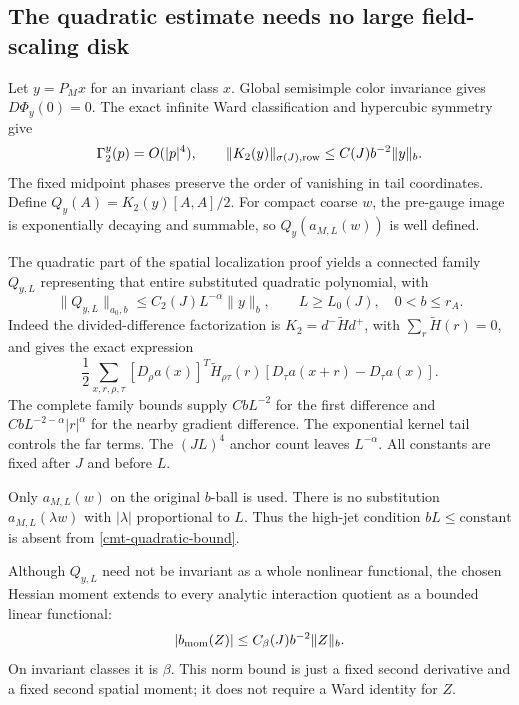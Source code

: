 \subsection{The quadratic estimate needs no large field-scaling disk}
\label{cmt-quadratic-section}

Let \(y=P_Mx\) for an invariant class \(x\). Global semisimple
color invariance gives \(D\Phi_y(0)=0\). The exact infinite Ward
classification and hypercubic symmetry give
\begin{equation}
 \Gamma_2^y(p)=O(|p|^4),\qquad
 \|K_2(y)\|_{\sigma(J),{\rm row}}
                         \le C(J)b^{-2}\|y\|_b.
 \label{cmt-kernel}
\end{equation}
The fixed midpoint phases preserve the order of vanishing in
tail coordinates. Define \(Q_y(A)=K_2(y)[A,A]/2\).
For compact coarse \(w\), the pre-gauge image is exponentially
decaying and summable, so \(Q_y(a_{M,L}(w))\) is well defined.

The quadratic part of the spatial localization proof yields
a connected family \(Q_{y,L}\) representing that entire
substituted quadratic polynomial, with
\begin{equation}
 \|Q_{y,L}\|_{a_0,b}
       \le C_2(J)L^{-\alpha}\|y\|_b,
       \qquad L\ge L_0(J),\quad 0<b\le r_A.
 \label{cmt-quadratic-bound}
\end{equation}
Indeed the divided-difference factorization is
\(K_2=d^-\widetilde H d^+\), with
\(\sum_r\widetilde H(r)=0\), and gives the exact expression
\[
 \frac12\sum_{x,r,\rho,\tau}
 [D_\rho a(x)]^T\widetilde H_{\rho\tau}(r)
                    [D_\tau a(x+r)-D_\tau a(x)].
\]
The complete family bounds supply \(CbL^{-2}\) for the first
difference and \(CbL^{-2-\alpha}|r|^\alpha\) for the nearby
gradient difference. The exponential kernel tail controls
the far terms. The \((JL)^4\) anchor count leaves
\(L^{-\alpha}\). All constants are fixed after \(J\) and
before \(L\).

Only \(a_{M,L}(w)\) on the original \(b\)-ball is used.
There is no substitution \(a_{M,L}(\lambda w)\) with
\(|\lambda|\) proportional to \(L\). Thus the high-jet
condition \(bL\le\text{constant}\) is absent from
\eqref{cmt-quadratic-bound}.

Although \(Q_{y,L}\) need not be invariant as a whole nonlinear
functional, the chosen Hessian moment extends to every analytic
interaction quotient as a bounded linear functional:
\begin{equation}
 |b_{\rm mom}(Z)|\le C_\beta(J)b^{-2}\|Z\|_b.
 \label{cmt-moment-bound}
\end{equation}
On invariant classes it is \(\beta\). This norm bound is just
a fixed second derivative and a fixed second spatial moment;
it does not require a Ward identity for \(Z\).

